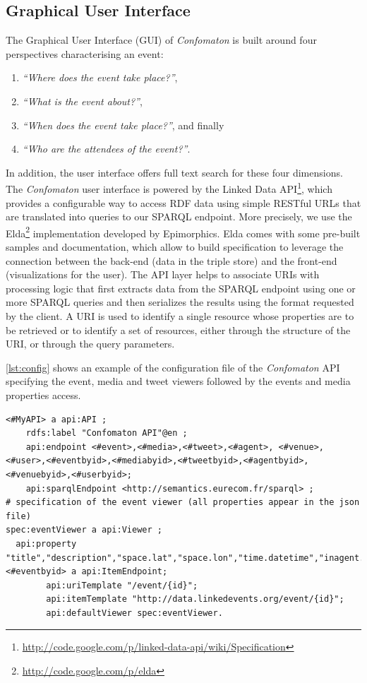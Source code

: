\subsection{Graphical User Interface}
The Graphical User Interface (GUI) of \emph{Confomaton} is built around four perspectives characterising an event:
\begin{enumerate}
\item  \textit{``Where does the event take place?''},
\item  \textit{``What is the event about?''},
\item  \textit{``When does the event take place?''}, and finally
\item  \textit{``Who are the attendees of the event?''}.
\end{enumerate}
In addition, the user interface offers full text search for these four dimensions. The \emph{Confomaton} user interface is powered by the Linked Data API\footnote{\url{http://code.google.com/p/linked-data-api/wiki/Specification}}, which provides a configurable way to access RDF data using simple RESTful URLs that are translated into queries to our SPARQL endpoint. More precisely, we use the Elda\footnote{\url{http://code.google.com/p/elda}} implementation developed by Epimorphics. Elda comes with some pre-built samples and documentation, which allow to build specification to leverage the connection between the back-end (data in the triple store) and the front-end (visualizations for the user). The API layer helps to associate URIs with processing logic that first extracts data from the SPARQL endpoint using one or more SPARQL queries and then serializes the results using the format requested by the client. A URI is used to identify a single resource whose properties are to be retrieved or to identify a set of resources, either through the structure of the URI, or through the query parameters.

\autoref{lst:config} shows an example of the configuration file of the \emph{Confomaton} API specifying the event, media and tweet viewers followed by the events and media properties access.
\begin{lstlisting}[caption={Example configuration file of the \emph{Confomaton} API, specifying event properties access.},label={lst:config}]
<#MyAPI> a api:API ;
	rdfs:label "Confomaton API"@en ;
	api:endpoint <#event>,<#media>,<#tweet>,<#agent>, <#venue>,<#user>,<#eventbyid>,<#mediabyid>,<#tweetbyid>,<#agentbyid>,<#venuebyid>,<#userbyid>;
	api:sparqlEndpoint <http://semantics.eurecom.fr/sparql> ;
# specification of the event viewer (all properties appear in the json file)
spec:eventViewer a api:Viewer ;
  api:property "title","description","space.lat","space.lon","time.datetime","inagent.label",...
<#eventbyid> a api:ItemEndpoint;
		api:uriTemplate "/event/{id}";
		api:itemTemplate "http://data.linkedevents.org/event/{id}";
		api:defaultViewer spec:eventViewer.		
\end{lstlisting}

